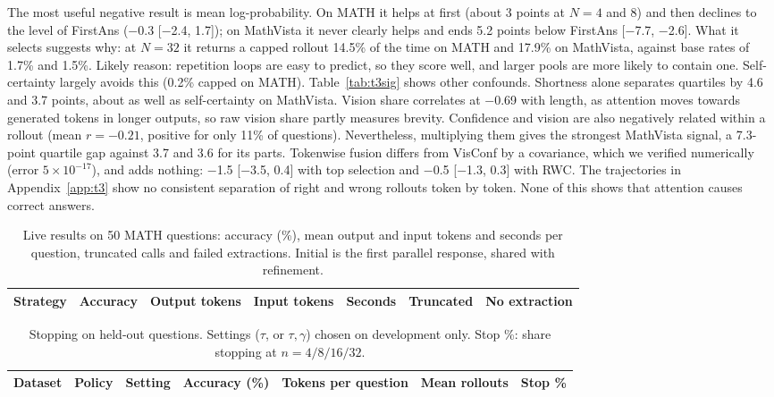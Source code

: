 \documentclass{article}
\begin{document}
The most useful negative result is mean log-probability. On MATH it helps at first (about 3 points at $N=4$ and 8) and then declines to the level of FirstAns ($-$0.3 [$-$2.4, 1.7]); on MathVista it never clearly helps and ends 5.2 points below FirstAns [$-$7.7, $-$2.6]. What it selects suggests why: at $N=32$ it returns a capped rollout 14.5\% of the time on MATH and 17.9\% on MathVista, against base rates of 1.7\% and 1.5\%. Likely reason: repetition loops are easy to predict, so they score well, and larger pools are more likely to contain one. Self-certainty largely avoids this (0.2\% capped on MATH). Table~\ref{tab:t3sig} shows other confounds. Shortness alone separates quartiles by 4.6 and 3.7 points, about as well as self-certainty on MathVista. Vision share correlates at $-$0.69 with length, as attention moves towards generated tokens in longer outputs, so raw vision share partly measures brevity. Confidence and vision are also negatively related within a rollout (mean $r=-0.21$, positive for only 11\% of questions). Nevertheless, multiplying them gives the strongest MathVista signal, a 7.3-point quartile gap against 3.7 and 3.6 for its parts. Tokenwise fusion differs from VisConf by a covariance, which we verified numerically (error $5\times10^{-17}$), and adds nothing: $-$1.5 [$-$3.5, 0.4] with top selection and $-$0.5 [$-$1.3, 0.3] with RWC. The trajectories in Appendix~\ref{app:t3} show no consistent separation of right and wrong rollouts token by token. None of this shows that attention causes correct answers.

\begin{table}[t]
\centering\footnotesize
\caption{Live results on 50 MATH questions: accuracy (\%), mean output and input tokens and seconds per question, truncated calls and failed extractions. Initial is the first parallel response, shared with refinement.}
\label{tab:live}
\begin{tabular}{lcccccc}
\toprule
Strategy & Accuracy & Output tokens & Input tokens & Seconds & Truncated & No extraction \\
\midrule

\bottomrule
\end{tabular}
\end{table}

\begin{table}[t]
\centering\footnotesize
\caption{Stopping on held-out questions. Settings ($\tau$, or $\tau,\gamma$) chosen on development only. Stop \%: share stopping at $n=4/8/16/32$.}
\label{tab:adaptive}
\begin{tabular}{llccccc}
\toprule
Dataset & Policy & Setting & Accuracy (\%) & Tokens per question & Mean rollouts & Stop \% \\
\midrule

\bottomrule
\end{tabular}
\end{table}
\end{document}

